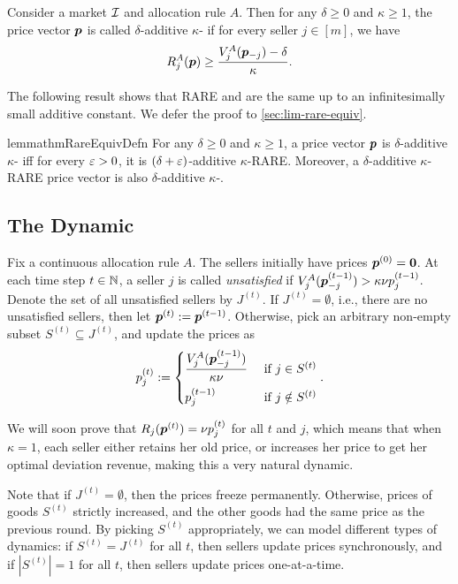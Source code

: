 \begin{definition}
\label{defn:lim-RARE}
Consider a market $\mathcal{I}$ and allocation rule $A$.
Then for any $\delta \ge 0$ and $\kappa \ge 1$, the price vector $\bm{p}$
is called $\delta$-additive $\kappa$-\limRARE{} if for every seller $j \in [m]$, we have
\[ R^A_j(\bm{p}) \ge \frac{V^A_j(\bm{p}_{-j}) - \delta}{\kappa}. \]
\end{definition}

The following result shows that RARE and \limRARE{} are the same up to
an infinitesimally small additive constant.
We defer the proof to \cref{sec:lim-rare-equiv}.

\begin{restatable}{lemma}{thmRareEquivDefn}
\label{thm:rare-equiv-defn}
For any $\delta \ge 0$ and $\kappa \ge 1$,
a price vector $\bm{p}$ is $\delta$-additive $\kappa$-\limRARE{} iff
for every $\varepsilon > 0$, it is $(\delta + \varepsilon)$-additive $\kappa$-RARE.
Moreover, a $\delta$-additive $\kappa$-RARE price vector is also
$\delta$-additive $\kappa$-\limRARE.
\end{restatable}

\subsection{The Dynamic}
\label{sec:dynamics:defn}

Fix a continuous allocation rule $A$. The sellers initially have prices $\bm{p}^{(0)} = \mathbf{0}$.
At each time step $t \in \mathbb{N}$, a seller $j$ is called \emph{unsatisfied} if
$V^A_j(\bm{p}^{(t-1)}_{-j}) > \kappa\nu p^{(t-1)}_j$.
Denote the set of all unsatisfied sellers by $J^{(t)}$.
If $J^{(t)} = \emptyset$, i.e., there are no unsatisfied sellers,
then let $\bm{p}^{(t)} := \bm{p}^{(t-1)}$.
Otherwise, pick an arbitrary non-empty subset $S^{(t)} \subseteq J^{(t)}$, and update the prices as
\[ p^{(t)}_j := \begin{cases}
\displaystyle \frac{V^A_j(\bm{p}^{(t-1)}_{-j})}{\kappa\nu} & \text{ if } j \in S^{(t)}
\\[0.8em] p^{(t-1)}_j & \text{ if } j \notin S^{(t)}
\end{cases}. \]

We will soon prove that $R_j(\bm{p}^{(t)}) = \nu p^{(t)}_j$ for all $t$ and $j$, which means that when $\kappa = 1$,
each seller either retains her old price, or increases her price to get her optimal deviation revenue,
making this a very natural dynamic.

Note that if $J^{(t)} = \emptyset$, then the prices freeze permanently.
Otherwise, prices of goods $S^{(t)}$ strictly increased, and the other goods had the same price as the previous round.
By picking $S^{(t)}$ appropriately, we can model different types of dynamics:
if $S^{(t)} = J^{(t)}$ for all $t$, then sellers update prices synchronously,
and if $|S^{(t)}| = 1$ for all $t$, then sellers update prices one-at-a-time.


